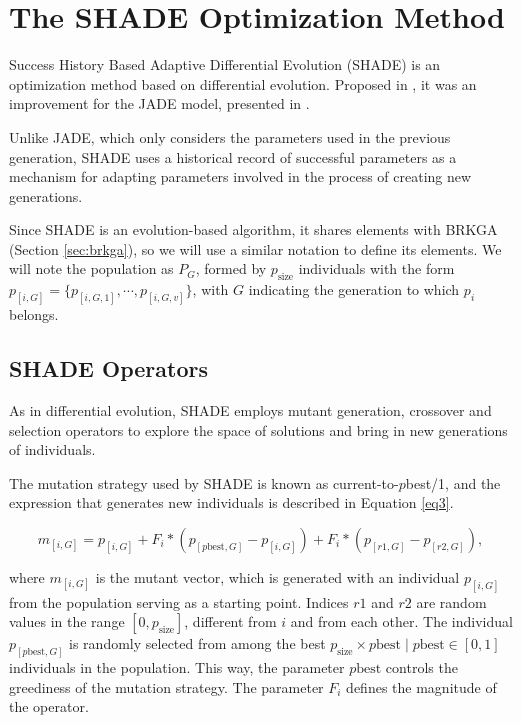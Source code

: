\documentclass[review]{elsarticle}
\begin{document}
\section{The SHADE Optimization Method} \label{sec:SHADE}

Success History Based Adaptive Differential Evolution (SHADE) is an optimization method based on differential evolution. Proposed in \cite{tanabe2013success}, it was an improvement for the JADE model, presented in \cite{zhang2009jade}.

Unlike JADE, which only considers the parameters used in the previous generation, SHADE uses a historical record of successful parameters as a mechanism for adapting parameters involved in the process of creating new generations.

Since SHADE is an evolution-based algorithm, it shares elements with BRKGA (Section \ref{sec:brkga}), so we will use a similar notation to define its elements. We will note the population as $P_G$, formed by $p_\text{size}$ individuals with the form $p_{[i,G]} = \{p_{[i,G,1]}, \cdots, p_{[i,G,v]}\}$, with $G$ indicating the generation to which $p_i$ belongs.

\subsection{SHADE Operators}

As in differential evolution, SHADE employs mutant generation, crossover and selection operators to explore the space of solutions and bring in new generations of individuals.

The mutation strategy used by SHADE is known as current-to-$p$best/1, and the expression that generates new individuals is described in Equation \eqref{eq3}.

\begin{equation}
m_{[i,G]} = p_{[i,G]} + F_i * (p_{[p\text{best}, G]} - p_{[i,G]}) + F_i * (p_{[r1, G]} - p_{[r2,G]}),
\label{eq3}
\end{equation}

\noindent where $m_{[i,G]}$ is the mutant vector, which is generated with an individual $p_{[i,G]}$ from the population serving as a starting point. Indices $r1$ and $r2$ are random values in the range $[0,p_\text{size}]$, different from $i$ and from each other. The individual $p_{[p\text{best}, G]}$ is randomly selected from among the best $p_\text{size} \times p\text{best}\;|\;p\text{best}\in [0,1]$ individuals in the population. This way, the parameter $p\text{best}$ controls the greediness of the mutation strategy. The parameter $F_i$ defines the magnitude of the operator.
\end{document}

